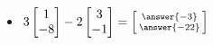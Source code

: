 \documentclass{ximera}
\begin{document}
\begin{exercise}
\begin{itemize}
        \item
        $3\begin{bmatrix} 1 \\ -8  \end{bmatrix} - 2 \begin{bmatrix} 3 \\ -1 \end{bmatrix} = \left[\begin{smallmatrix} \answer{-3} \\ \answer{-22} \end{smallmatrix}\right]$
    \end{itemize}
\end{exercise}
\end{document}
